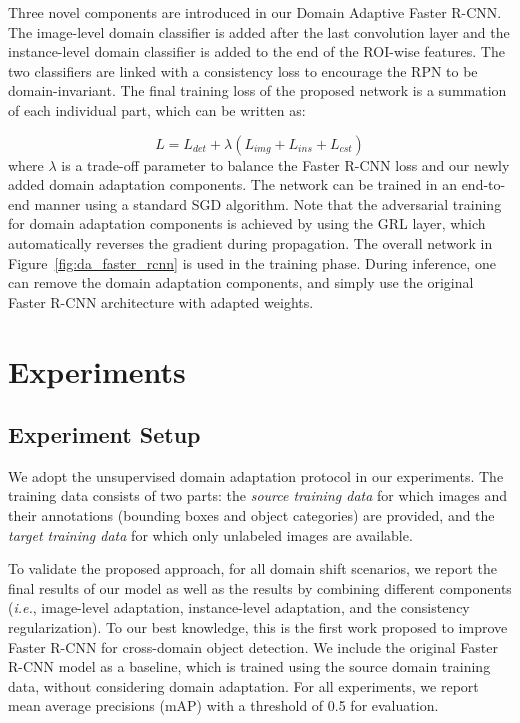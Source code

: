 \documentclass[10pt,twocolumn,letterpaper]{article}
\def\ie{\emph{i.e.}}
\begin{document}
Three novel components are introduced in our Domain Adaptive Faster R-CNN. The image-level domain classifier is added after the last convolution layer and the instance-level domain classifier is added to the end of the ROI-wise features. The two classifiers are linked with a consistency loss to encourage the RPN to be domain-invariant. The final training loss of the proposed network is a summation of each individual part, which can be written as:

\begin{equation}
L = L_{det} + \lambda(L_{img}+L_{ins} +L_{cst}) 
\label{eqn:final_loss}
\end{equation}
where $\lambda$ is a trade-off parameter to balance the Faster R-CNN loss and our newly added domain adaptation components. The network can be trained in an end-to-end manner using a standard SGD algorithm. Note that the adversarial training for domain adaptation components is achieved by using the GRL layer, which automatically reverses the gradient during propagation. The overall network in Figure~\ref{fig:da_faster_rcnn} is used in the training phase. During inference, one can remove the domain adaptation components, and simply use the original Faster R-CNN architecture with adapted weights. 

\section{Experiments}
\label{sec:exp}
\subsection{Experiment Setup}
We adopt the unsupervised domain adaptation protocol in our experiments. The training data consists of two parts: the \textit{source training data} for which images and their annotations (bounding boxes and object categories) are provided, and the \textit{target training data} for which only unlabeled images are available. 

To validate the proposed approach, for all domain shift scenarios, we report the final results of our model as well as the results by combining different components (\ie, image-level adaptation, instance-level adaptation, and the consistency regularization). To our best knowledge, this is the first work proposed to improve Faster R-CNN for cross-domain object detection. We include the original Faster R-CNN model as a baseline, which is trained using the source domain training data, without considering domain adaptation. For all experiments, we report mean average precisions (mAP) with a threshold of 0.5 for evaluation.
\end{document}

